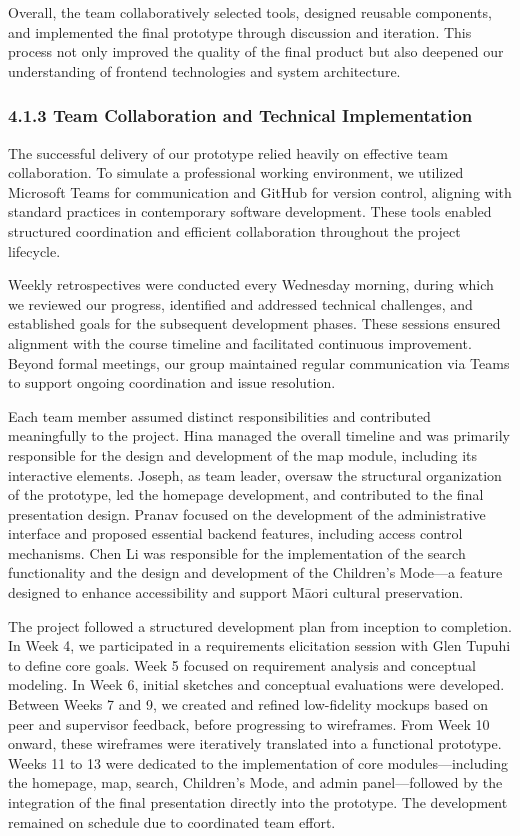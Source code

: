 Overall, the team collaboratively selected tools, designed reusable components, and implemented the final prototype through discussion and iteration. This process not only improved the quality of the final product but also deepened our understanding of frontend technologies and system architecture.

\subsubsection*{4.1.3 Team Collaboration and Technical Implementation}

The successful delivery of our prototype relied heavily on effective team collaboration. To simulate a professional working environment, we utilized Microsoft Teams for communication and GitHub for version control, aligning with standard practices in contemporary software development. These tools enabled structured coordination and efficient collaboration throughout the project lifecycle.

Weekly retrospectives were conducted every Wednesday morning, during which we reviewed our progress, identified and addressed technical challenges, and established goals for the subsequent development phases. These sessions ensured alignment with the course timeline and facilitated continuous improvement. Beyond formal meetings, our group maintained regular communication via Teams to support ongoing coordination and issue resolution.

Each team member assumed distinct responsibilities and contributed meaningfully to the project. Hina managed the overall timeline and was primarily responsible for the design and development of the map module, including its interactive elements. Joseph, as team leader, oversaw the structural organization of the prototype, led the homepage development, and contributed to the final presentation design. Pranav focused on the development of the administrative interface and proposed essential backend features, including access control mechanisms. Chen Li was responsible for the implementation of the search functionality and the design and development of the Children’s Mode—a feature designed to enhance accessibility and support Māori cultural preservation.

The project followed a structured development plan from inception to completion. In Week 4, we participated in a requirements elicitation session with Glen Tupuhi to define core goals. Week 5 focused on requirement analysis and conceptual modeling. In Week 6, initial sketches and conceptual evaluations were developed. Between Weeks 7 and 9, we created and refined low-fidelity mockups based on peer and supervisor feedback, before progressing to wireframes. From Week 10 onward, these wireframes were iteratively translated into a functional prototype. Weeks 11 to 13 were dedicated to the implementation of core modules—including the homepage, map, search, Children’s Mode, and admin panel—followed by the integration of the final presentation directly into the prototype. The development remained on schedule due to coordinated team effort.

